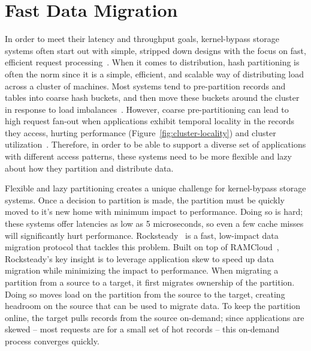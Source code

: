 \chapter{Fast Data Migration}

In order to meet their latency and throughput goals, kernel-bypass
storage systems often start out with simple, stripped down designs with
the focus on fast, efficient request processing~\cite{mica}.
%
When it comes to distribution, hash partitioning is often the norm since
it is a simple, efficient, and scalable way of distributing load across
a cluster of machines.
%
Most systems tend to pre-partition records and tables into coarse hash
buckets, and then move these buckets around the cluster in response to
load imbalances~\cite{dynamo}.
%
However, coarse pre-partitioning can lead to high request fan-out when
applications exhibit temporal locality in the records they access,
hurting performance (Figure~\ref{fig:cluster-locality}) and cluster
utilization~\cite{rocksteady}.
%
Therefore, in order to be able to support a diverse set of applications
with different access patterns, these systems need to be more flexible
and lazy about how they partition and distribute data.



Flexible and lazy partitioning creates a unique challenge for
kernel-bypass storage systems.
%
Once a decision to partition is made, the partition must be quickly
moved to it’s new home with minimum impact to performance.
%
Doing so is hard; these
systems offer latencies as low as 5 microseconds,
so even a few cache misses will significantly hurt
performance.
%
Rocksteady~\cite{rocksteady} is a fast, low-impact
data migration protocol that tackles this problem.
%
Built on top of RAMCloud~\cite{ramcloud}, Rocksteady’s key insight is to
leverage application skew to speed up data migration while minimizing
the impact to performance.
%
When migrating a partition from a source to a target, it first migrates
ownership of the partition.
%
Doing so moves load on the partition from the source to the target, creating
headroom on the source that can be used to migrate data.
%
To keep the partition online, the target pulls records from the source
on-demand; since applications are skewed – most requests are for a small
set of hot records – this on-demand process converges quickly.

